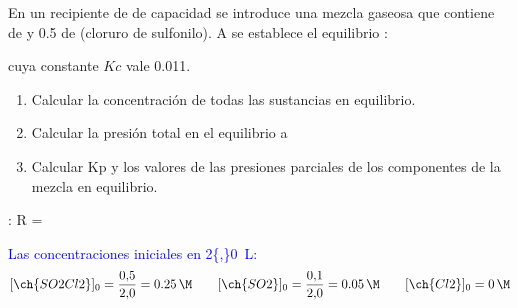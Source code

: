 \begin{exerciseEVAU}
    En un recipiente de  de capacidad se introduce una mezcla gaseosa que contiene  de  y \num{0,5} de  (cloruro de sulfonilo). A  se establece el equilibrio :
    \begin{center}
    \end{center}
    cuya constante \(Kc\) vale \num{0,011}.
    \begin{enumerate}[label=\letraminuscula]
        \item Calcular la concentración de todas las sustancias en equilibrio.
        \item Calcular la presión total en el equilibrio a 
        \item Calcular Kp y los valores de las presiones parciales de los componentes de la mezcla en equilibrio.
    \end{enumerate}
    \datos{}: R = \ctegases

    \begin{solu}

    \textcolor{blue}{Las concentraciones iniciales en \qty{2{,}0}{\L}:}
    \[
        [\ch{SO2Cl2}]_0 = \frac{0{,}5}{2{,}0} = \qty{0{,}25}{\M} \qquad [\ch{SO2}]_0 = \frac{0{,}1}{2{,}0} = \qty{0{,}05}{\M} \qquad [\ch{Cl2}]_0 = \qty{0}{\M}
    \]


\end{solu}
\end{exerciseEVAU}
